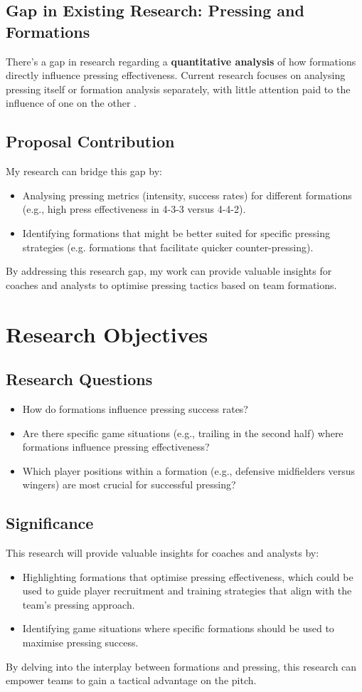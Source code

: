\documentclass[12pt]{article}
\begin{document}
\subsection{Gap in Existing Research: Pressing and Formations}
There's a gap in research regarding a \textbf{quantitative analysis} of how formations directly influence pressing effectiveness. Current research focuses on analysing pressing itself or formation analysis separately, with little attention paid to the influence of one on the other \citep{forcher_keys_2022}.

\subsection{Proposal Contribution}
My research can bridge this gap by:
\begin{itemize}
    \item Analysing pressing metrics (intensity, success rates) for different formations (e.g., high press effectiveness in 4-3-3 versus 4-4-2).
    \item Identifying formations that might be better suited for specific pressing strategies (e.g. formations that facilitate quicker counter-pressing).
\end{itemize}
By addressing this research gap, my work can provide valuable insights for coaches and analysts to optimise pressing tactics based on team formations.

\section{Research Objectives}
\subsection{Research Questions}
\begin{itemize}
    \item How do formations influence pressing success rates?
    \item Are there specific game situations (e.g., trailing in the second half) where formations influence pressing effectiveness?
    \item Which player positions within a formation (e.g., defensive midfielders versus wingers) are most crucial for successful pressing?
\end{itemize}

\subsection{Significance}
This research will provide valuable insights for coaches and analysts by:
\begin{itemize}
    \item Highlighting formations that optimise pressing effectiveness, which could be used to guide player recruitment and training strategies that align with the team's pressing approach.
    \item Identifying game situations where specific formations should be used to maximise pressing success.
\end{itemize}
By delving into the interplay between formations and pressing, this research can empower teams to gain a tactical advantage on the pitch.
\end{document}
